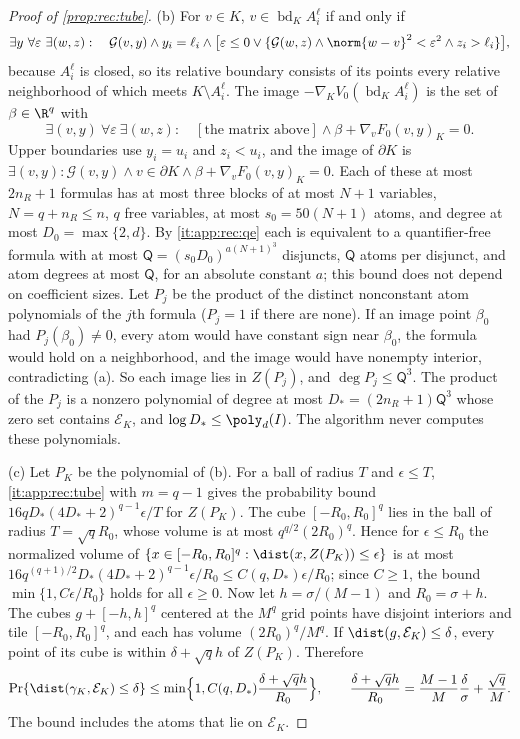 \begin{proof}[Proof of \cref{prop:rec:tube}]
(b) For $v\in K$, $v\in\operatorname{bd}_KA_i^\ell$ if and only if
\[
 \exists y\ \forall\varepsilon\ \exists(w,z):\quad\mathcal G(v,y)\wedge
 y_i=\ell_i\wedge\bigl[\varepsilon\le0\vee\{\mathcal G(w,z)\wedge
 \norm{w-v}^2<\varepsilon^2\wedge z_i>\ell_i\}\bigr],
\]
because $A_i^\ell$ is closed, so its relative boundary consists of its points
every relative neighborhood of which meets $K\setminus A_i^\ell$. The image
$-\nabla_KV_0(\operatorname{bd}_KA_i^\ell)$ is the set of $\beta\in\R^q$ with
\[
 \exists(v,y)\ \forall\varepsilon\ \exists(w,z):\quad
 [\text{the matrix above}]\wedge\beta+\nabla_vF_0(v,y)_K=0 .
\]
Upper boundaries use $y_i=u_i$ and $z_i<u_i$, and the image of $\partial K$
is $\exists(v,y):\mathcal G(v,y)\wedge v\in\partial K\wedge
\beta+\nabla_vF_0(v,y)_K=0$. Each of these at most $2n_R+1$ formulas has at most
three blocks of at most $N+1$ variables, $N=q+n_R\le n$, $q$ free variables, at
most $s_0=50(N+1)$ atoms, and degree at most $D_0=\max\{2,d\}$. By
\ref{it:app:rec:qe} each is equivalent to a quantifier-free formula with at
most $\mathsf Q=(s_0D_0)^{a(N+1)^3}$ disjuncts, $\mathsf Q$ atoms per
disjunct, and atom degrees at most $\mathsf Q$, for an absolute constant $a$;
this bound does not depend on coefficient sizes. Let $P_j$ be the product of
the distinct nonconstant atom polynomials of the $j$th formula ($P_j=1$ if
there are none). If an image point $\beta_0$ had $P_j(\beta_0)\ne0$, every atom
would have constant sign near $\beta_0$, the formula would hold on a
neighborhood, and the image would have nonempty interior, contradicting (a).
So each image lies in $Z(P_j)$, and $\deg P_j\le\mathsf Q^3$. The product of
the $P_j$ is a nonzero polynomial of degree at most
$D_*=(2n_R+1)\mathsf Q^3$ whose zero set contains $\mathcal E_K$, and
$\log D_*\le\poly_d(I)$. The algorithm never computes these polynomials.

(c) Let $P_K$ be the polynomial of (b). For a ball of radius $T$ and
$\epsilon\le T$, \ref{it:app:rec:tube} with $m=q-1$ gives the probability bound
$16qD_*(4D_*+2)^{q-1}\epsilon/T$ for $Z(P_K)$. The cube $[-R_0,R_0]^q$ lies in
the ball of radius $T=\sqrt qR_0$, whose volume is at most $q^{q/2}(2R_0)^q$.
Hence for $\epsilon\le R_0$ the normalized volume of
$\{x\in[-R_0,R_0]^q:\dist(x,Z(P_K))\le\epsilon\}$ is at most
$16q^{(q+1)/2}D_*(4D_*+2)^{q-1}\epsilon/R_0\le C(q,D_*)\epsilon/R_0$; since
$C\ge1$, the bound $\min\{1,C\epsilon/R_0\}$ holds for all $\epsilon\ge0$.
Now let $h=\sigma/(M-1)$ and $R_0=\sigma+h$. The cubes $g+[-h,h]^q$ centered at
the $M^q$ grid points have disjoint interiors and tile $[-R_0,R_0]^q$, and each
has volume $(2R_0)^q/M^q$. If $\dist(g,\mathcal E_K)\le\delta$, every point
of its cube is within $\delta+\sqrt qh$ of $Z(P_K)$. Therefore
\[
 \Pr\{\dist(\gamma_K,\mathcal E_K)\le\delta\}\le
 \min\Bigl\{1,C(q,D_*)\frac{\delta+\sqrt qh}{R_0}\Bigr\},\qquad
 \frac{\delta+\sqrt qh}{R_0}=\frac{M-1}M\frac\delta\sigma+\frac{\sqrt q}M .
\]
The bound includes the atoms that lie on $\mathcal E_K$.
\end{proof}

